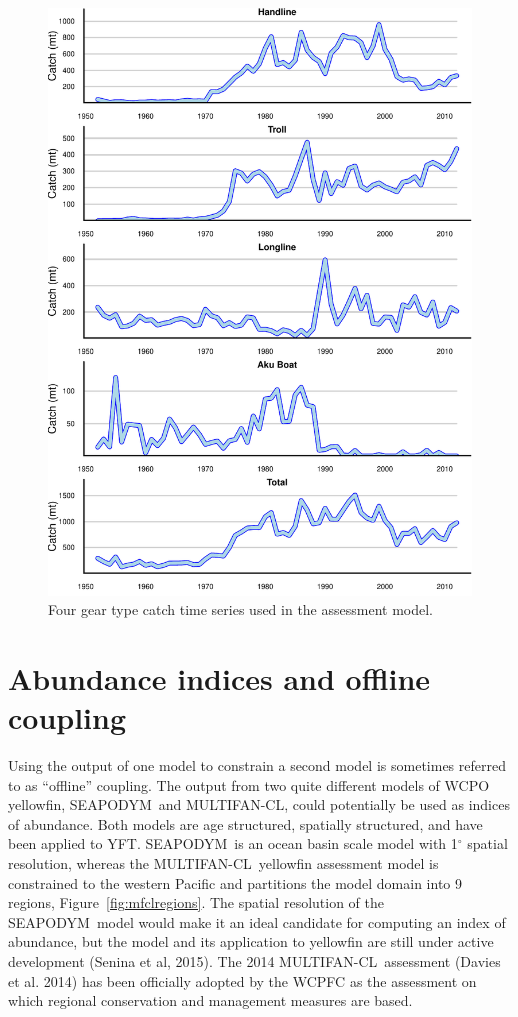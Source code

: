 \documentclass[12pt,letterpaper]{article}
\renewcommand\deg[1]{$^\circ$#1}
\newcommand\SD{SEAPODYM}
\newcommand\MFCL{MULTIFAN-CL}
\begin{document}
\begin{figure}
\begin{center}
\includegraphics[height=0.8\textheight]{./4_gear_catch_history_a.pdf}
\caption{\label{fig:data}
Four gear type catch time series used in the assessment model.
}
\end{center}
\end{figure}

\clearpage
\section{Abundance indices and offline coupling}
\label{sec:index}
Using the output of one model to constrain a second model is sometimes
referred to as ``offline'' coupling. 
The output from two quite different models of WCPO yellowfin,
\SD\ and \MFCL, could potentially be used as indices of abundance.
Both models are age structured, spatially structured, and have been
applied to YFT.
\SD\ is an ocean basin scale model with 1\deg{} spatial resolution,
whereas the \MFCL\ yellowfin assessment model is constrained to the
western Pacific and partitions the model domain into 9 regions,
Figure~\ref{fig:mfclregions}.
The spatial resolution of the \SD\ model would make it an ideal
candidate for computing an index of abundance, but the model and its
application to yellowfin are still under active development (Senina et
al, 2015). 
The 2014 \MFCL\ assessment (Davies et al. 2014) has been officially
adopted by the WCPFC as the assessment on which regional conservation
and management measures are based.
\end{document}
